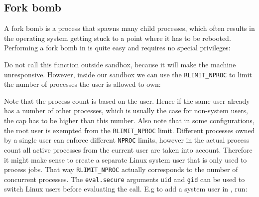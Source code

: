 \begin{appendix}
\section{Fork bomb}

A fork bomb is a process that spawns many child processes, which often results
in the operating system getting stuck to a point where it has to be rebooted.
Performing a fork bomb in \R is quite easy and requires no special privileges:

\begin{knitrout}\mycodesize
{}\color{fgcolor}\begin{kframe}
\begin{alltt}
 \hlkwb{<-} \hlstd{() \{}
     \hlstd{\{}
        \hlstd{(}\hlstd{())}
    \hlstd{\}}
\hlstd{\}}
\end{alltt}
\end{kframe}
\end{knitrout}


Do not call this function outside sandbox, because it will make the machine
unresponsive. However, inside our sandbox we can use the \texttt{RLIMIT\_NPROC}
to limit the number of processes the user is allowed to own:

\begin{knitrout}\mycodesize
{}\color{fgcolor}\begin{kframe}
\begin{alltt}
\hlstd{(}\hlstd{(),}  \hlstd{=} \hlstd{)}
\end{alltt}


{\ttfamily\noindent\bfseries\color{errorcolor}{\#\# Error: unable to fork, possible reason: Resource temporarily unavailable}}\end{kframe}
\end{knitrout}


Note that the process count is based on the \Linux user. Hence if the same
\Linux user already has a number of other processes, which is usually the case
for non-system users, the cap has to be higher than this number. Also note that
in some \Linux configurations, the root user is exempted from the
\texttt{RLIMIT\_NPROC} limit. 
Different processes owned by a single user can enforce different \texttt{NPROC}
limits, however in the actual process count all active processes from the
current user are taken into account. Therefore it might make sense to create a
separate Linux system user that is only used to process \R jobs. That way
\texttt{RLIMIT\_NPROC} actually corresponds to the number of concurrent \R
processes. The \texttt{eval.secure} arguments \texttt{uid} and \texttt{gid}
can be used to switch Linux users before evaluating the call. E.g to add a
system user in \Linux, run:


\end{appendix}
